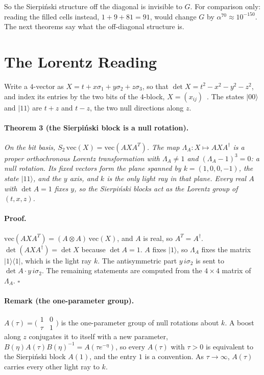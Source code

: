 \documentclass[twocolumn]{iopjournal}
\begin{document}
\medskip
\noindent
So the Sierpi\'nski structure off the diagonal is invisible to $G$.
For comparison only: reading the filled cells instead,
$1 + 9 + 81 = 91$, would change $G$ by $\alpha^{70} \approx 10^{-150}$.
The next theorems say what the off-diagonal structure is.


\section*{The Lorentz Reading}

Write a $4$-vector as $X = t + x\sigma_1 + y\sigma_2 + z\sigma_3$, so
that $\det X = t^2 - x^2 - y^2 - z^2$, and index its entries by the
two bits of the $4$-block, $X = (x_{ij})$~\cite{PenroseRindler}. The
states $|00\rangle$ and $|11\rangle$ are $t + z$ and $t - z$, the two
null directions along $z$.

\paragraph{Theorem 3 (the Sierpi\'nski block is a null rotation).}
\textit{On the bit basis, $S_2\,\mathrm{vec}(X) = \mathrm{vec}(AXA^T)$.
The map $\Lambda_A : X \mapsto AXA^{\dagger}$ is a proper
orthochronous Lorentz transformation with $\Lambda_A \ne 1$ and
$(\Lambda_A - 1)^3 = 0$: a null rotation. Its fixed vectors form the
plane spanned by $k = (1,0,0,-1)$, the state $|11\rangle$, and the
$y$ axis, and $k$ is the only light ray in that plane. Every real $A$
with $\det A = 1$ fixes $y$, so the Sierpi\'nski blocks act as the
Lorentz group of $(t, x, z)$.}

\paragraph{Proof.} $\mathrm{vec}(AXA^T) = (A \otimes A)\,
\mathrm{vec}(X)$, and $A$ is real, so $A^T = A^\dagger$.
$\det(AXA^\dagger) = \det X$ because $\det A = 1$. $A$ fixes
$|1\rangle$, so $\Lambda_A$ fixes the matrix
$|1\rangle\langle1|$, which is the light ray $k$. The antisymmetric part $y\,i\sigma_2$ is sent to
$\det A \cdot y\,i\sigma_2$. The remaining statements are computed
from the $4 \times 4$ matrix of $\Lambda_A$. \hfill $\square$

\paragraph{Remark (the one-parameter group).} $A(\tau) =
\bigl(\begin{smallmatrix}1&0\\\tau&1\end{smallmatrix}\bigr)$ is the
one-parameter group of null rotations about $k$. A boost along $z$
conjugates it to itself with a new parameter, $B(\eta)A(\tau)B(\eta)^{-1}
= A(\tau e^{-\eta})$, so every $A(\tau)$ with $\tau > 0$ is equivalent
to the Sierpi\'nski block $A(1)$, and the entry $1$ is a convention. As
$\tau \to \infty$, $A(\tau)$ carries every other light ray to $k$.
\end{document}
